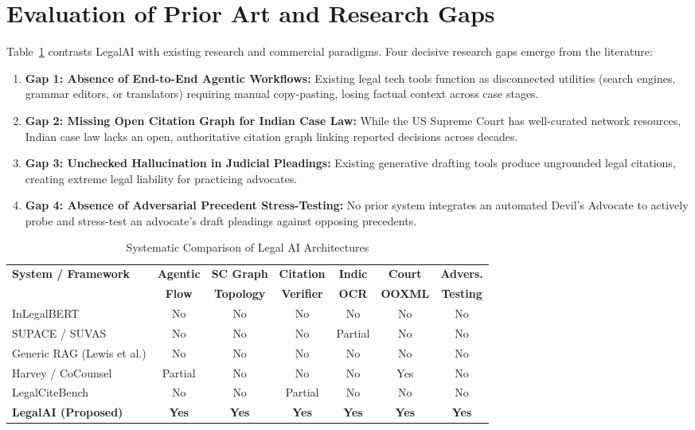 \documentclass[conference]{IEEEtran}
\begin{document}
\section{Evaluation of Prior Art and Research Gaps}
Table~\ref{tab:comparison} contrasts LegalAI with existing research and commercial paradigms. Four decisive research gaps emerge from the literature:
\begin{enumerate}
    \item \textbf{Gap 1: Absence of End-to-End Agentic Workflows:} Existing legal tech tools function as disconnected utilities (search engines, grammar editors, or translators) requiring manual copy-pasting, losing factual context across case stages.
    \item \textbf{Gap 2: Missing Open Citation Graph for Indian Case Law:} While the US Supreme Court has well-curated network resources, Indian case law lacks an open, authoritative citation graph linking reported decisions across decades.
    \item \textbf{Gap 3: Unchecked Hallucination in Judicial Pleadings:} Existing generative drafting tools produce ungrounded legal citations, creating extreme legal liability for practicing advocates.
    \item \textbf{Gap 4: Absence of Adversarial Precedent Stress-Testing:} No prior system integrates an automated Devil's Advocate to actively probe and stress-test an advocate's draft pleadings against opposing precedents.
\end{enumerate}

\begin{table}[t]
\caption{Systematic Comparison of Legal AI Architectures}
\label{tab:comparison}
\centering
\scriptsize
\setlength{\tabcolsep}{2.2pt}
\begin{tabular}{lcccccc}
\toprule
\textbf{System / Framework} & \textbf{Agentic} & \textbf{SC Graph} & \textbf{Citation} & \textbf{Indic} & \textbf{Court} & \textbf{Advers.} \\
 & \textbf{Flow} & \textbf{Topology} & \textbf{Verifier} & \textbf{OCR} & \textbf{OOXML} & \textbf{Testing} \\
\midrule
InLegalBERT \cite{inlegalbert} & No & No & No & No & No & No \\
SUPACE / SUVAS \cite{supace,suvas} & No & No & No & Partial & No & No \\
Generic RAG (Lewis et al.) & No & No & No & No & No & No \\
Harvey / CoCounsel \cite{liu2026survey} & Partial & No & No & No & Yes & No \\
LegalCiteBench & No & No & Partial & No & No & No \\
\textbf{LegalAI (Proposed)} & \textbf{Yes} & \textbf{Yes} & \textbf{Yes} & \textbf{Yes} & \textbf{Yes} & \textbf{Yes} \\
\bottomrule
\end{tabular}
\end{table}
\end{document}

